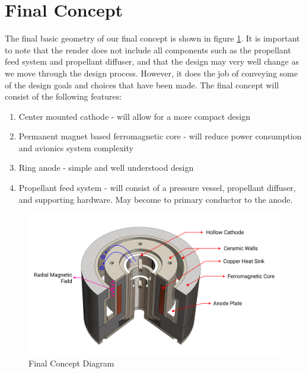 \section{Final Concept}

The final basic geometry of our final concept is shown in figure \ref{fig:final_concept}. It is important to note that the render does not include all components such as the propellant feed system and propellant diffuser, and that the design may very well change as we move through the design process. However, it does the job of conveying some of the design goals and choices that have been made. The final concept will consist of the following features:

\begin{enumerate}
    \item Center mounted cathode - will allow for a more compact design
    \item Permanent magnet based ferromagnetic core - will reduce power consumption and avionics system complexity
    \item Ring anode - simple and well understood design
    \item Propellant feed system - will consist of a pressure vessel, propellant diffuser, and supporting hardware. May become to primary conductor to the anode.
\end{enumerate}

\begin{figure}[H]
    \centering
    \includegraphics[width=1.0\textwidth]{images/Concepts/final concept.png}
    \captionsetup{justification=centering}
    \caption{Final Concept Diagram}
    \label{fig:final_concept}
\end{figure}